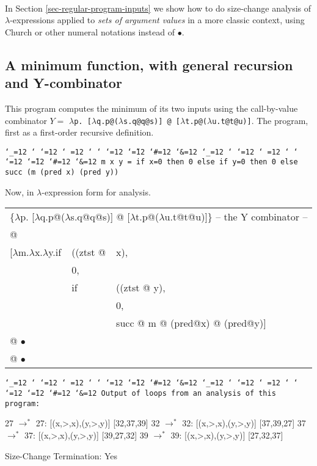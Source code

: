 \documentclass{LMCS}
\makeatletter
\newcommand{\hair}{\hspace{2mm}}
\newcommand{\vair}{\relax}
\newcommand{\bt}{\begin{tabular}}
\newcommand{\et}{\end{tabular}}
\newcommand{\bp}{\begin{program}\small}
\newcommand{\ep}{\end{program}}
\newcommand{\programenvironment}{\programmode \def\par{\leavevmode\endgraf}\obeylines\nobreak \programmode}
\newcommand{\programmode}{\tt \catcode`\_=12 \catcode`\?=12 \catcode`\.=12 \catcode`\,=12
	\catcode`\;=12 \catcode`\:=12 \catcode`\@=12 \catcode`\~=12
        \catcode`\#=12 \catcode`\&=12      \obeyspaces\frenchspacing}
\newenvironment{programintext}{\programenvironment}{}
\newenvironment{program}{\setlength{\partopsep}{0mm}\setlength{\topsep}{0mm}
	\begin{trivlist}\item[]
\hspace*{5mm}\begin{minipage}{1.0\textwidth}
\vspace{1mm}
	\begin{programintext}
	}{\end{programintext}
	\vspace{1mm}
	\end{minipage}
	\end{trivlist}
	\noindent}
\theoremstyle{definition}\newtheorem{env}[thm]{Environment}
\makeatother
\begin{document}
\

In Section \ref{sec-regular-program-inputs} we show how to do size-change analysis 
of  $\lambda$-expressions applied to {\em sets  of  argument values} in a more classic context, using Church or other numeral notations instead of $\bullet$.

\subsection{A minimum function, with general recursion and Y-combinator}


This program computes the minimum of its two inputs using the call-by-value 
combinator 
$Y=$ {\tt$\lambda$p. [$\lambda$q.p@($\lambda$s.q@q@s)] @
                     [$\lambda$t.p@($\lambda$u.t@t@u)]}.
The program, first as a first-order recursive definition.

\bp
  m x y = if x=0 then 0 else if y=0 then 0 else succ (m (pred x) (pred y))

\ep
Now,  in $\lambda$-expression form for analysis.\medskip


{\tt\bt{lllllll}
\multicolumn{7}{l}{
\{$\lambda$p. [$\lambda$q.p@($\lambda$s.q@q@s)] @
                     [$\lambda$t.p@($\lambda$u.t@t@u)]\} \hair -- the Y combinator --}\\

@\\

[$\lambda$m.$\lambda$x.$\lambda$y.\fbox{27:}if&((ztst @ &x),\\

&0,\\

&\fbox{32:}\hair\hair if&((ztst @ y),\\

&&0,\\

&&\fbox{37:}succ @ \fbox{39:} m @ (pred@x) @ (pred@y)] \\

@ $\bullet$\\

@ $\bullet$
\et}



\bp
Output of loops from an analysis of this program:

27 $\to^*$ 27: [(x,>,x),(y,>,y)]    [32,37,39]
32 $\to^*$ 32: [(x,>,x),(y,>,y)]    [37,39,27]
37 $\to^*$ 37: [(x,>,x),(y,>,y)]    [39,27,32]
39 $\to^*$ 39: [(x,>,x),(y,>,y)]    [27,32,37]

Size-Change Termination: Yes
\ep
\vair
\end{document}
